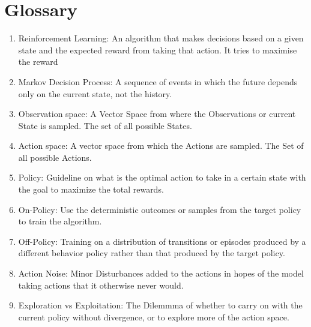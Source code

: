 \documentclass{article}
\begin{document}
\pagebreak





\pagebreak

\section*{Glossary}
\begin{enumerate}
    \item Reinforcement Learning: An algorithm that makes decisions based on a given state and the expected reward from taking that action. It tries to maximise the reward
    \item Markov Decision Process: A sequence of events in which the future depends only on the current state, not the history.
    \item Observation space: A Vector Space from where the Observations or current State is sampled. The set of all possible States.
    \item Action space: A vector space from which the Actions are sampled. The Set of all possible Actions.
    \item Policy: Guideline on what is the optimal action to take in a certain state with the goal to maximize the total rewards.
    \item On-Policy: Use the deterministic outcomes or samples from the target policy to train the algorithm.
    \item Off-Policy: Training on a distribution of transitions or episodes produced by a different behavior policy rather than that produced by the target policy.
    \item Action Noise: Minor Disturbances added to the actions in hopes of the model taking actions that it otherwise never would.
    \item Exploration vs Exploitation: The Dilemmma of whether to carry on with the current policy without divergence, or to explore more of the action space.
\end{enumerate}
\end{document}
